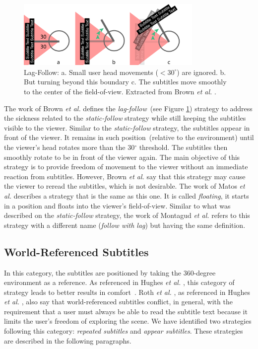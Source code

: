 \begin{figure}[!ht]
    \centering
    \includegraphics[width=0.8\textwidth]{img/video360/lag-follow.png}
    \caption{Lag-Follow: a. Small user head movements ($<30^{\circ}$) are ignored. b. But turning beyond this boundary c. The subtitles move smoothly to the center of the field-of-view. Extracted from Brown \emph{et al.} \cite{brown_subtitles_2017}.}
    \label{fig:lag_follow}
\end{figure}

The work of Brown \emph{et al.} \cite{brown_subtitles_2017} defines the \emph{lag-follow}~(see Figure \ref{fig:lag_follow}) strategy to address the sickness related to the \emph{static-follow} strategy while still keeping the subtitles visible to the viewer. Similar to the \emph{static-follow} strategy, the subtitles appear in front of the viewer. It remains in such position~(relative to the environment) until the viewer's head rotates more than the 30$^{\circ}$ threshold. The subtitles then smoothly rotate to be in front of the viewer again. The main objective of this strategy is to provide freedom of movement to the viewer without an immediate reaction from subtitles. However, Brown \emph{et al.} \cite{brown_subtitles_2017} say that this strategy may cause the viewer to reread the subtitles, which is not desirable.
The work of Matos \emph{et al.} \cite{matos_dynamic_2018} describes a strategy that is the same as this one. It is called \emph{floating}, it starts in a position and floats into the viewer's field-of-view. Similar to what was described on the \emph{static-follow} strategy, the work of Montagud \emph{et al.} \cite{montagud_culture_2020} refers to this strategy with a different name (\emph{follow with lag}) but having the same definition.

\subsection{World-Referenced Subtitles}
\label{subsec:world_referenced}

In this category, the subtitles are positioned by taking the 360-degree environment as a reference. 
As referenced in Hughes \emph{et al.} \cite{hughes_disruptive_2019}, this category of strategy leads to better results in comfort~\cite{rothe2018positioning}. Roth \emph{et al.} \cite{rothe2018positioning}, as referenced in Hughes \emph{et al.} \cite{hughes_disruptive_2019}, also say that world-referenced subtitles conflict, in general, with the requirement that a user must always be able to read the subtitle text because it limits the user's freedom of exploring the scene.
We have identified two strategies following this category: \emph{repeated subtitles} and \emph{appear subtitles}. These strategies are described in the following paragraphs. 

